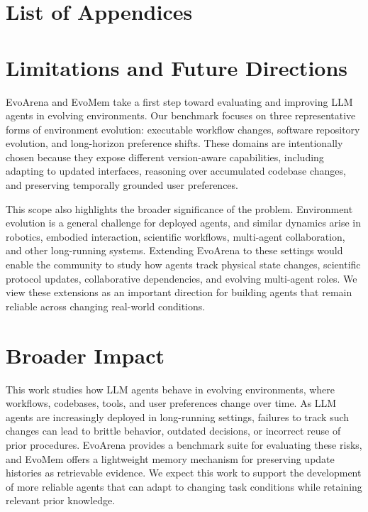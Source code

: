 \documentclass{article}
\begin{document}
\appendix

\startcontents[appendix]

\section*{List of Appendices}
\clearpage

\section{Limitations and Future Directions}
\label{sec:scope_future}

EvoArena and EvoMem take a first step toward evaluating and improving LLM agents in evolving environments. Our benchmark focuses on three representative forms of environment evolution: executable workflow changes, software repository evolution, and long-horizon preference shifts. These domains are intentionally chosen because they expose different version-aware capabilities, including adapting to updated interfaces, reasoning over accumulated codebase changes, and preserving temporally grounded user preferences.

This scope also highlights the broader significance of the problem. Environment evolution is a general challenge for deployed agents, and similar dynamics arise in robotics, embodied interaction, scientific workflows, multi-agent collaboration, and other long-running systems. Extending EvoArena to these settings would enable the community to study how agents track physical state changes, scientific protocol updates, collaborative dependencies, and evolving multi-agent roles. We view these extensions as an important direction for building agents that remain reliable across changing real-world conditions.

\section{Broader Impact}
\label{app:broader_impact}

This work studies how LLM agents behave in evolving environments, where workflows, codebases, tools, and user preferences change over time. As LLM agents are increasingly deployed in long-running settings, failures to track such changes can lead to brittle behavior, outdated decisions, or incorrect reuse of prior procedures. EvoArena provides a benchmark suite for evaluating these risks, and EvoMem offers a lightweight memory mechanism for preserving update histories as retrievable evidence. We expect this work to support the development of more reliable agents that can adapt to changing task conditions while retaining relevant prior knowledge.
\end{document}

